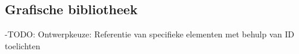 \subsection{Grafische bibliotheek} \label{subsec:grafische_bibliotheek}

-TODO: Ontwerpkeuze: Referentie van specifieke elementen met behulp van ID toelichten